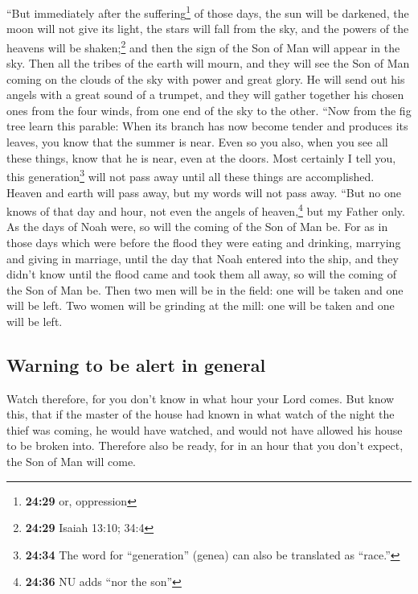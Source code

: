 \begin{paracol}{2}
\begin{otherlanguage}{english}
 ``But immediately after the suffering\footnote{\textbf{24:29}
  or, oppression} of those days, the sun will be darkened, the moon will
not give its light, the stars will fall from the sky, and the powers of
the heavens will be shaken;\footnote{\textbf{24:29} Isaiah 13:10; 34:4}
 and then the sign of the Son of Man will appear in the
sky. Then all the tribes of the earth will mourn, and they will see the
Son of Man coming on the clouds of the sky with power and great glory.
 He will send out his angels with a great sound of a
trumpet, and they will gather together his chosen ones from the four
winds, from one end of the sky to the other.  ``Now from
the fig tree learn this parable: When its branch has now become tender
and produces its leaves, you know that the summer is near.
 Even so you also, when you see all these things, know
that he is near, even at the doors.  Most certainly I
tell you, this generation\footnote{\textbf{24:34} The word for
  ``generation'' (genea) can also be translated as ``race.''} will not
pass away until all these things are accomplished. 
Heaven and earth will pass away, but my words will not pass away.
 ``But no one knows of that day and hour, not even the
angels of heaven,\footnote{\textbf{24:36} NU adds ``nor the son''} but
my Father only.  As the days of Noah were, so will the
coming of the Son of Man be.  For as in those days which
were before the flood they were eating and drinking, marrying and giving
in marriage, until the day that Noah entered into the ship,
 and they didn't know until the flood came and took them
all away, so will the coming of the Son of Man be.  Then
two men will be in the field: one will be taken and one will be left.
 Two women will be grinding at the mill: one will be
taken and one will be left.

\hypertarget{warning-to-be-alert-in-general}{%
\subsection{Warning to be alert in
general}\label{warning-to-be-alert-in-general}}

 Watch therefore, for you don't know in what hour your
Lord comes.  But know this, that if the master of the
house had known in what watch of the night the thief was coming, he
would have watched, and would not have allowed his house to be broken
into.  Therefore also be ready, for in an hour that you
don't expect, the Son of Man will come.


\end{otherlanguage}
\end{paracol}
